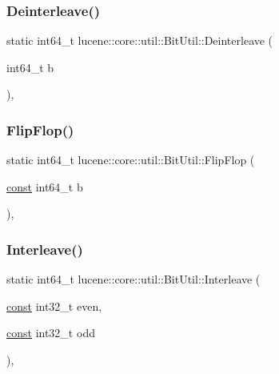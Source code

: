 \subsubsection{\texorpdfstring{Deinterleave()}{Deinterleave()}}
{\footnotesize\ttfamily static int64\+\_\+t lucene\+::core\+::util\+::\+Bit\+Util\+::\+Deinterleave (\begin{DoxyParamCaption}\item[{int64\+\_\+t}]{b }\end{DoxyParamCaption})\hspace{0.3cm}{\ttfamily [inline]}, {\ttfamily [static]}}

\mbox{\label{classlucene_1_1core_1_1util_1_1BitUtil_a3a692f77230f75e522b1accd7a80b64d}} 
\subsubsection{\texorpdfstring{Flip\+Flop()}{FlipFlop()}}
{\footnotesize\ttfamily static int64\+\_\+t lucene\+::core\+::util\+::\+Bit\+Util\+::\+Flip\+Flop (\begin{DoxyParamCaption}\item[{\mbox{\hyperlink{ZlibCrc32_8h_a2c212835823e3c54a8ab6d95c652660e}{const}} int64\+\_\+t}]{b }\end{DoxyParamCaption})\hspace{0.3cm}{\ttfamily [inline]}, {\ttfamily [static]}}

\mbox{\label{classlucene_1_1core_1_1util_1_1BitUtil_af64fe541adea9f69656c8a5b205d9a90}} 
\subsubsection{\texorpdfstring{Interleave()}{Interleave()}}
{\footnotesize\ttfamily static int64\+\_\+t lucene\+::core\+::util\+::\+Bit\+Util\+::\+Interleave (\begin{DoxyParamCaption}\item[{\mbox{\hyperlink{ZlibCrc32_8h_a2c212835823e3c54a8ab6d95c652660e}{const}} int32\+\_\+t}]{even,  }\item[{\mbox{\hyperlink{ZlibCrc32_8h_a2c212835823e3c54a8ab6d95c652660e}{const}} int32\+\_\+t}]{odd }\end{DoxyParamCaption})\hspace{0.3cm}{\ttfamily [inline]}, {\ttfamily [static]}}

